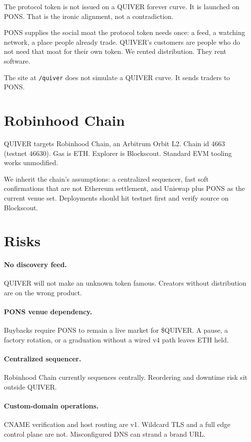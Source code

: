 \documentclass[11pt,a4paper]{article}
\begin{document}
The protocol token is not issued on a QUIVER forever curve. It is launched on PONS. That is the ironic alignment, not a contradiction.

PONS supplies the social moat the protocol token needs once: a feed, a watching network, a place people already trade. QUIVER's customers are people who do not need that moat for their own token. We rented distribution. They rent software.

The site at \texttt{/quiver} does not simulate a QUIVER curve. It sends traders to PONS.

\section{Robinhood Chain}

QUIVER targets Robinhood Chain, an Arbitrum Orbit L2. Chain id $4663$ (testnet $46630$). Gas is ETH. Explorer is Blockscout. Standard EVM tooling works unmodified.

We inherit the chain's assumptions: a centralized sequencer, fast soft confirmations that are not Ethereum settlement, and Uniswap plus PONS as the current venue set. Deployments should hit testnet first and verify source on Blockscout.

\section{Risks}

\paragraph{No discovery feed.}
QUIVER will not make an unknown token famous. Creators without distribution are on the wrong product.

\paragraph{PONS venue dependency.}
Buybacks require PONS to remain a live market for \$QUIVER. A pause, a factory rotation, or a graduation without a wired v4 path leaves ETH held.

\paragraph{Centralized sequencer.}
Robinhood Chain currently sequences centrally. Reordering and downtime risk sit outside QUIVER.

\paragraph{Custom-domain operations.}
CNAME verification and host routing are v1. Wildcard TLS and a full edge control plane are not. Misconfigured DNS can strand a brand URL.
\end{document}

